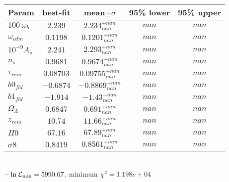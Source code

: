 \begin{tabular}{|l|c|c|c|c|} 
 \hline 
Param & best-fit & mean$\pm\sigma$ & 95\% lower & 95\% upper \\ \hline 
$100~\omega_{b }$ &$2.239$ & $2.234_{nan}^{+nan}$ & $nan$ & $nan$ \\ 
$\omega_{cdm }$ &$0.1198$ & $0.1201_{nan}^{+nan}$ & $nan$ & $nan$ \\ 
$10^{+9}A_{s }$ &$2.241$ & $2.293_{nan}^{+nan}$ & $nan$ & $nan$ \\ 
$n_{s }$ &$0.9681$ & $0.9674_{nan}^{+nan}$ & $nan$ & $nan$ \\ 
$\tau_{reio }$ &$0.08703$ & $0.09755_{nan}^{+nan}$ & $nan$ & $nan$ \\ 
$b0_{fld }$ &$-0.6874$ & $-0.8869_{nan}^{+nan}$ & $nan$ & $nan$ \\ 
$b1_{fld }$ &$-1.914$ & $-1.43_{nan}^{+nan}$ & $nan$ & $nan$ \\ 
$\Omega_{\Lambda }$ &$0.6847$ & $0.691_{nan}^{+nan}$ & $nan$ & $nan$ \\ 
$z_{reio }$ &$10.74$ & $11.66_{nan}^{+nan}$ & $nan$ & $nan$ \\ 
$H0$ &$67.16$ & $67.89_{nan}^{+nan}$ & $nan$ & $nan$ \\ 
$\sigma8$ &$0.8419$ & $0.8561_{nan}^{+nan}$ & $nan$ & $nan$ \\ 
\hline 
 \end{tabular} \\ 
$-\ln{\cal L}_\mathrm{min} =5990.67$, minimum $\chi^2=1.198e+04$ \\ 

